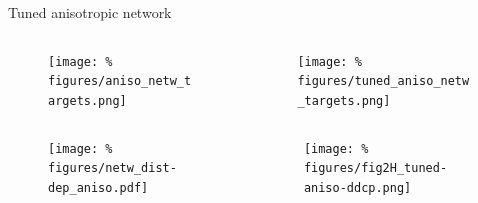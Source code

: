 
\begin{frame}{Tuned anisotropic network}
  \vspace{-0.8cm}
  \begin{columns}
    \begin{column}{.5\textwidth}
      \minipage[c][0.45\textheight][s]{\columnwidth}

      \begin{figure}
        \centering
        \texttt{[image: \%
          figures/aniso\_netw\_targets.png]} %
      \end{figure}
      
      
      \endminipage      
    \end{column}
    \begin{column}{.5\textwidth}
      \minipage[c][0.45\textheight][s]{\columnwidth}

      \begin{figure}
        \centering
        \texttt{[image: \%
          figures/tuned\_aniso\_netw\_targets.png]} %
      \end{figure}
      
      \endminipage
    \end{column}
  \end{columns}

  \vspace{-0.6cm}
  
  \begin{columns}
    \begin{column}{.5\textwidth}
      \minipage[c][0.25\textheight][s]{\columnwidth}

      \begin{figure}
        \centering
        \texttt{[image: \%
          figures/netw\_dist-dep\_aniso.pdf]} %
      \end{figure}

      
      
      \endminipage      
    \end{column}
    \begin{column}{.5\textwidth}
      \minipage[c][0.25\textheight][s]{\columnwidth}

      \begin{figure}
        \centering
        \texttt{[image: \%
          figures/fig2H\_tuned-aniso-ddcp.png]} %
      \end{figure}

      
      
      \endminipage      
      
      
    \end{column}
  \end{columns}
  


  
\end{frame}





